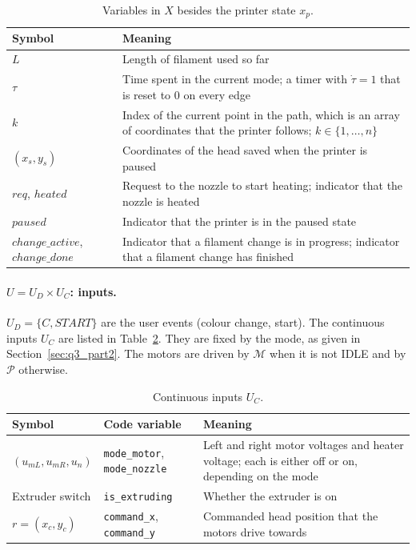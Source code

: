 \begin{table}[H]
    \centering
    \small
    \caption{Variables in $X$ besides the printer state $x_p$.}
    \label{tab:q3_vars}
    \begin{tabular}{@{}lp{}@{}}
        \toprule
        Symbol & Meaning \\
        \midrule
        $L$ & Length of filament used so far \\
        $\tau$ & Time spent in the current mode; a timer with $\dot{\tau} = 1$ that is reset to $0$ on every edge \\
        $k$ & Index of the current point in the path, which is an array of coordinates that the printer follows; $k \in \{1, \dots, n\}$ \\
        $(x_s, y_s)$ & Coordinates of the head saved when the printer is paused \\
        $\mathit{req}$, $\mathit{heated}$ & Request to the nozzle to start heating; indicator that the nozzle is heated \\
        $\mathit{paused}$ & Indicator that the printer is in the paused state \\
        $\mathit{change\_active}$, $\mathit{change\_done}$ & Indicator that a filament change is in progress; indicator that a filament change has finished \\
        \bottomrule
    \end{tabular}
\end{table}

\paragraph{\texorpdfstring{$U = U_D \times U_C$}{U = UD x UC}: inputs.} $U_D = \{C, \mathit{START}\}$ are the user events (colour change, start). The continuous inputs $U_C$ are listed in Table~\ref{tab:q3_inputs}. They are fixed by the mode, as given in Section~\ref{sec:q3_part2}. The motors are driven by $\mathcal{M}$ when it is not IDLE and by $\mathcal{P}$ otherwise.


\begin{table}[H]
    \centering
    \small
    \caption{Continuous inputs $U_C$.}
    \label{tab:q3_inputs}
    \begin{tabular}{@{}llp{}@{}}
        \toprule
        Symbol & Code variable & Meaning \\
        \midrule
        $(u_{mL}, u_{mR}, u_n)$ & \texttt{mode\_motor}, \texttt{mode\_nozzle} & Left and right motor voltages and heater voltage; each is either off or on, depending on the mode \\
        Extruder switch & \texttt{is\_extruding} & Whether the extruder is on \\
        $r = (x_c, y_c)$ & \texttt{command\_x}, \texttt{command\_y} & Commanded head position that the motors drive towards \\
        \bottomrule
    \end{tabular}
\end{table}

